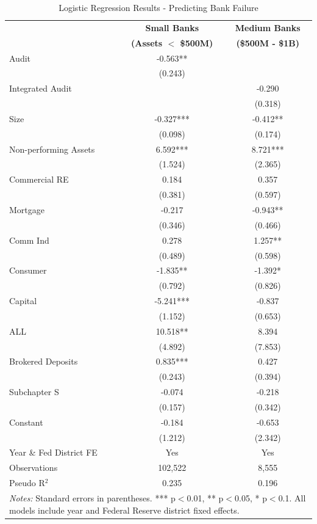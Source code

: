 \documentclass[12pt]{article}
\begin{document}
\begin{table}[H]
\centering
\caption{Logistic Regression Results - Predicting Bank Failure}
\label{tab:regression}
\footnotesize  %
\setlength{\tabcolsep}{3pt}  %
\begin{tabular}{lcc}
\toprule
 & \multicolumn{1}{c}{\textbf{Small Banks}} & \multicolumn{1}{c}{\textbf{Medium Banks}} \\
 & \textbf{(Assets $<$ \$500M)} & \textbf{(\$500M - \$1B)} \\
\midrule
Audit & -0.563** & \\
 & (0.243) & \\
Integrated Audit & & -0.290 \\
 & & (0.318) \\
Size & -0.327*** & -0.412** \\
 & (0.098) & (0.174) \\
Non-performing Assets & 6.592*** & 8.721*** \\
 & (1.524) & (2.365) \\
Commercial RE & 0.184 & 0.357 \\
 & (0.381) & (0.597) \\
Mortgage & -0.217 & -0.943** \\
 & (0.346) & (0.466) \\
Comm Ind & 0.278 & 1.257** \\
 & (0.489) & (0.598) \\
Consumer & -1.835** & -1.392* \\
 & (0.792) & (0.826) \\
Capital & -5.241*** & -0.837 \\
 & (1.152) & (0.653) \\
ALL & 10.518** & 8.394 \\
 & (4.892) & (7.853) \\
Brokered Deposits & 0.835*** & 0.427 \\
 & (0.243) & (0.394) \\
Subchapter S & -0.074 & -0.218 \\
 & (0.157) & (0.342) \\
Constant & -0.184 & -0.653 \\
 & (1.212) & (2.342) \\
\midrule
Year \& Fed District FE & Yes & Yes \\
Observations & 102,522 & 8,555 \\
Pseudo R$^2$ & 0.235 & 0.196 \\
\bottomrule
\multicolumn{3}{p{0.85\linewidth}}{\scriptsize \textit{Notes:} Standard errors in parentheses. *** p$<$0.01, ** p$<$0.05, * p$<$0.1. All models include year and Federal Reserve district fixed effects.} \\
\end{tabular}
\end{table}\clearpage


\end{document}
